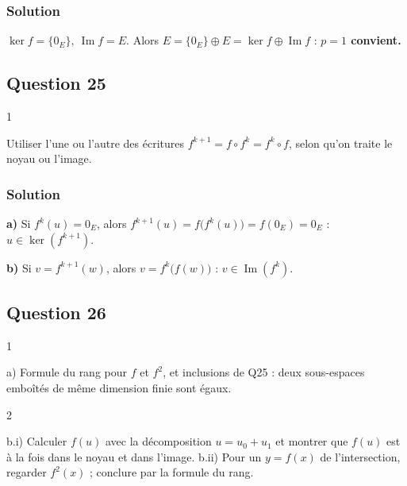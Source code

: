 \documentclass[11pt,a4paper]{article}
\begin{document}
\hypertarget{solution-23}{%
\subsubsection{Solution}\label{solution-23}}

\(\boxed{\ker f=\{0_E\},\ \operatorname{Im}f=E}\). Alors \(E=\{0_E\}\oplus E=\ker f\oplus\operatorname{Im}f\) : \textbf{\(p=1\) convient.}

\hypertarget{question-25}{%
\subsection{Question 25}\label{question-25}}

\begin{indication}{1}

Utiliser l'une ou l'autre des écritures \(f^{k+1}=f\circ f^k=f^k\circ f\), selon qu'on traite le noyau ou l'image.

\end{indication}

\hypertarget{solution-24}{%
\subsubsection{Solution}\label{solution-24}}

\textbf{a)} Si \(f^k(u)=0_E\), alors \(f^{k+1}(u)=f\big(f^k(u)\big)=f(0_E)=0_E\) : \(\boxed{u\in\ker(f^{k+1})}\).

\textbf{b)} Si \(v=f^{k+1}(w)\), alors \(v=f^k\big(f(w)\big)\) : \(\boxed{v\in\operatorname{Im}(f^k)}\).

\hypertarget{question-26}{%
\subsection{Question 26}\label{question-26}}

\begin{indication}{1}

a) Formule du rang pour \(f\) et \(f^2\), et inclusions de Q25 : deux sous-espaces emboîtés de même dimension finie sont égaux.

\end{indication}

\begin{indication}{2}

b.i) Calculer \(f(u)\) avec la décomposition \(u=u_0+u_1\) et montrer que \(f(u)\) est à la fois dans le noyau et dans l'image. b.ii) Pour un \(y=f(x)\) de l'intersection, regarder \(f^2(x)\) ; conclure par la formule du rang.

\end{indication}
\end{document}
